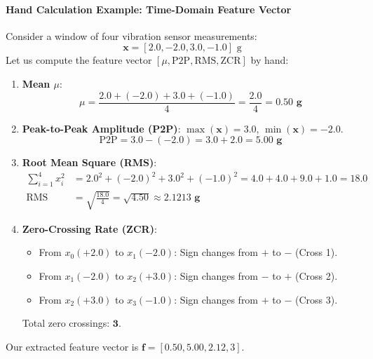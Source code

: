 \paragraph{Hand Calculation Example: Time-Domain Feature Vector}
Consider a window of four vibration sensor measurements:
\begin{equation*}
\mathbf{x} = [2.0, -2.0, 3.0, -1.0]\text{ g}
\end{equation*}
Let us compute the feature vector $[\mu, \text{P2P}, \text{RMS}, \text{ZCR}]$ by hand:
\begin{enumerate}
    \item \textbf{Mean $\mu$}:
    \begin{equation*}
    \mu = \frac{2.0 + (-2.0) + 3.0 + (-1.0)}{4} = \frac{2.0}{4} = \mathbf{0.50\text{ g}}
    \end{equation*}
    \item \textbf{Peak-to-Peak Amplitude (P2P)}:
    $\max(\mathbf{x}) = 3.0$, $\min(\mathbf{x}) = -2.0$.
    \begin{equation*}
    \text{P2P} = 3.0 - (-2.0) = 3.0 + 2.0 = \mathbf{5.00\text{ g}}
    \end{equation*}
    \item \textbf{Root Mean Square (RMS)}:
    \begin{align*}
    \sum_{i=1}^4 x_i^2 &= 2.0^2 + (-2.0)^2 + 3.0^2 + (-1.0)^2 = 4.0 + 4.0 + 9.0 + 1.0 = 18.0 \\
    \text{RMS} &= \sqrt{\frac{18.0}{4}} = \sqrt{4.50} \approx \mathbf{2.1213\text{ g}}
    \end{align*}
    \item \textbf{Zero-Crossing Rate (ZCR)}:
    \begin{itemize}
        \item From $x_0 (+2.0)$ to $x_1 (-2.0)$: Sign changes from $+$ to $-$ (Cross 1).
        \item From $x_1 (-2.0)$ to $x_2 (+3.0)$: Sign changes from $-$ to $+$ (Cross 2).
        \item From $x_2 (+3.0)$ to $x_3 (-1.0)$: Sign changes from $+$ to $-$ (Cross 3).
    \end{itemize}
    Total zero crossings: $\mathbf{3}$.
\end{enumerate}
Our extracted feature vector is $\mathbf{f} = [0.50, 5.00, 2.12, 3]$.

